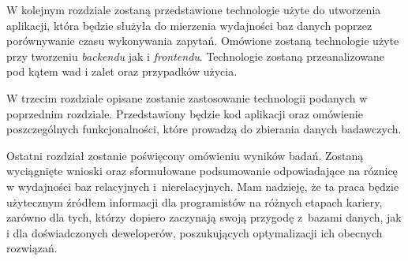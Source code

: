 W kolejnym rozdziale zostaną przedstawione technologie użyte do utworzenia aplikacji, która będzie służyła do mierzenia wydajności baz danych poprzez porównywanie czasu wykonywania zapytań. Omówione zostaną technologie użyte przy tworzeniu \textit{backendu} jak i \textit{frontendu}. Technologie zostaną przeanalizowane pod kątem wad i zalet oraz przypadków użycia.

W trzecim rozdziale opisane zostanie zastosowanie technologii podanych w poprzednim rozdziale. Przedstawiony będzie kod aplikacji oraz omówienie poszczególnych funkcjonalności, które prowadzą do zbierania danych badawczych.

Ostatni rozdział zostanie poświęcony omówieniu wyników badań. Zostaną  wyciągnięte wnioski oraz sformułowane podsumowanie odpowiadające na róznicę w wydajności baz relacyjnych i~nierelacyjnych. Mam nadzieję, że ta praca będzie użytecznym
źródłem informacji dla programistów na różnych etapach kariery, zarówno dla tych, którzy dopiero
zaczynają swoją przygodę z~bazami danych, jak i dla doświadczonych deweloperów, poszukujących
optymalizacji ich obecnych rozwiązań.
